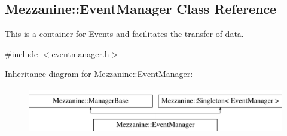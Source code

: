 \hypertarget{classMezzanine_1_1EventManager}{
\subsection{Mezzanine::EventManager Class Reference}
\label{classMezzanine_1_1EventManager}
}


This is a container for Events and facilitates the transfer of data.  




{\ttfamily \#include $<$eventmanager.h$>$}

Inheritance diagram for Mezzanine::EventManager:\begin{figure}[H]
\begin{center}
\leavevmode
\includegraphics[height=2.000000cm]{classMezzanine_1_1EventManager}
\end{center}
\end{figure}
